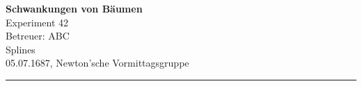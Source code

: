 \documentclass[10pt,a4paper,ngerman]{article}
\newcommand{\subject}{Schwankungen von Bäumen}
\newcommand{\experimentnumber}{42}
\newcommand{\experiment}{Experiment \experimentnumber}
\newcommand{\advisor}{Betreuer: ABC}
\newcommand{\authors}{Splines}
\newcommand{\experimentdate}{05.07.1687}
\newcommand{\group}{Newton'sche Vormittagsgruppe}
\begin{document}
\setlength{\abovedisplayskip}{0.2em}

\thispagestyle{plain} %

\vspace*{-2cm}

\begin{FlushLeft}
	\LARGE \textbf{\subject}\\
	\large \experiment\\
	
	\normalsize \advisor\\
	\authors\\
	
	\experimentdate, \group
	\hfill
	
	\vspace{3mm}
	
	\textcolor{heidelberg-red}{\rule{\linewidth}{1mm}}
\end{FlushLeft}

\tableofcontents
\setcounter{section}{0}
\pagebreak

\pagebreak

\pagebreak

\pagebreak

\end{document}
